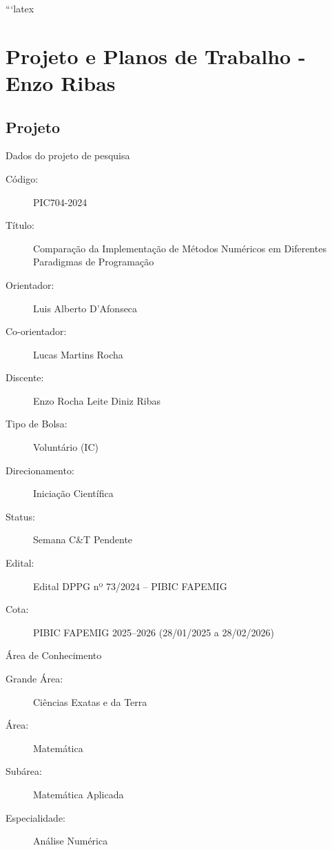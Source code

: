 ```latex
\chapter{Projeto e Planos de Trabalho - Enzo Ribas}
\label{cap:Projeto_e_Planos_de_Trabalho}

\section{Projeto}

\noindent
Dados do projeto de pesquisa

\begin{description}
  \item[Código:] PIC704-2024

  \item[Título:] Comparação da Implementação de Métodos Numéricos em Diferentes Paradigmas de Programação

  \item[Orientador:] Luis Alberto D'Afonseca
  \item[Co-orientador:] Lucas Martins Rocha 

  \item[Discente:] Enzo Rocha Leite Diniz Ribas

  \item[Tipo de Bolsa:] Voluntário (IC)

  \item[Direcionamento:] Iniciação Científica

  \item[Status:] Semana C\&T Pendente

  \item[Edital:] Edital DPPG nº 73/2024 -- PIBIC FAPEMIG

  \item[Cota:] PIBIC FAPEMIG 2025--2026
               (28/01/2025 a 28/02/2026)
\end{description}

\noindent
Área de Conhecimento

\begin{description}
  \item[Grande Área:] Ciências Exatas e da Terra

  \item[Área:] Matemática

  \item[Subárea:] Matemática Aplicada

  \item[Especialidade:] Análise Numérica
\end{description}

